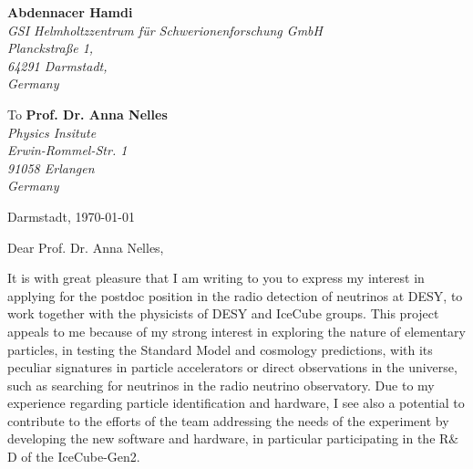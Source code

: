 \documentclass[11pt]{letter}
\begin{document}
 \sffamily
 \hfill
 \begin{flushleft}
 {\bfseries Abdennacer Hamdi}\\[.35ex]
 \small\itshape
 GSI Helmholtzzentrum f\"ur Schwerionenforschung GmbH\\ %
 Planckstraße 1,\\
 64291 Darmstadt,\\
 Germany\\ %
 \end{flushleft}
 \begin{flushleft}
 To {\bfseries Prof. Dr. Anna Nelles}\\[.35ex]
 \small\itshape
 Physics Insitute \\
 Erwin-Rommel-Str. 1 \\
 91058 Erlangen \\
 Germany

 \end{flushleft}
 \hfill
 \begin{flushleft}
 Darmstadt, \today \\
 
 \end{flushleft}
\par Dear Prof. Dr. Anna Nelles,
~\par It is with great pleasure that I am writing to you to express my interest in applying for the postdoc position in the radio detection of neutrinos at DESY, to work together with the physicists of DESY and IceCube groups. This project appeals to me because of my strong interest in exploring the nature of elementary particles, in testing the Standard Model and cosmology predictions, with its peculiar signatures in particle accelerators or direct observations in the universe, such as searching for neutrinos in the radio neutrino observatory. Due to my experience regarding particle identification and hardware, I see also a potential to contribute to the efforts of the team addressing the needs of the experiment by developing the new software and hardware, in particular participating in the R$\&$D of the IceCube-Gen2.
\end{document}
